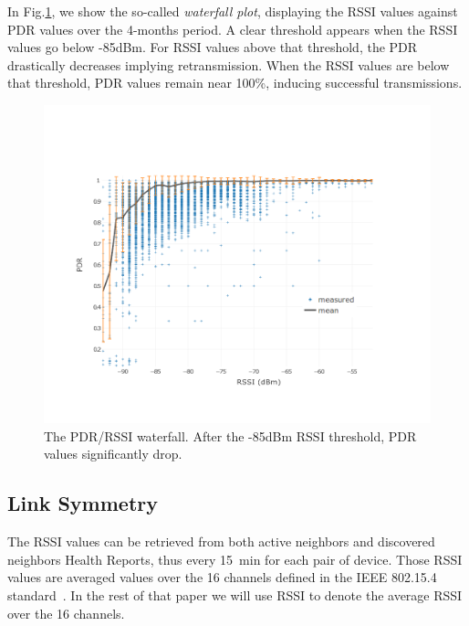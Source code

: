 \documentclass{sig-alternate}
\begin{document}

In Fig.\ref{fig:waterfall}, we show the so-called \textit{waterfall plot}, displaying the RSSI values against PDR values over the 4-months period.
A clear threshold appears when the RSSI values go below -85dBm.
For RSSI values above that threshold, the PDR drastically decreases implying retransmission.
When the RSSI values are below that threshold, PDR values remain near 100\%, inducing successful transmissions.

\begin{figure}
    \centering
    \includegraphics[width=\columnwidth]{waterfall}
    \caption{
        The PDR/RSSI waterfall.
        After the -85dBm RSSI threshold, PDR values significantly drop.
    }
    \label{fig:waterfall}
\end{figure}

\subsection{Link Symmetry}
\label{sec:symmetry}


The RSSI values can be retrieved from both active neighbors and discovered neighbors Health Reports, thus every 15~min for each pair of device.
Those RSSI values are averaged values over the 16 channels defined in the IEEE 802.15.4 standard~\cite{std_ieee802154_2011}.
In the rest of that paper we will use RSSI to denote the average RSSI over the 16 channels.
\end{document}
